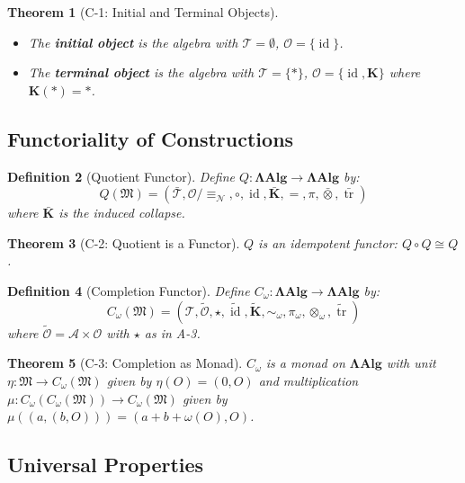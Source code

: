\documentclass[12pt, oneside]{article}
\newtheorem{theorem}{Theorem}[section]
\newtheorem{definition}[theorem]{Definition}
\DeclareMathOperator{\id}{id}
\DeclareMathOperator{\tr}{tr}
\newcommand{\K}{\mathbf{K}}
\newcommand{\N}{\mathcal{N}}
\newcommand{\A}{\mathcal{A}}
\newcommand{\T}{\mathcal{T}}
\newcommand{\Opr}{\mathcal{O}}
\newcommand{\wtilde}{\widetilde}
\newcommand{\mf}[1]{\mathfrak{#1}}
\begin{document}
\begin{theorem}[C-1: Initial and Terminal Objects]
\begin{itemize}
    \item The \textbf{initial object} is the algebra with $\T = \emptyset$, $\Opr = \{\id\}$.
    \item The \textbf{terminal object} is the algebra with $\T = \{*\}$, $\Opr = \{\id, \K\}$ where $\K(*) = *$.
\end{itemize}
\end{theorem}

\subsection{Functoriality of Constructions}

\begin{definition}[Quotient Functor]
Define $Q: \mathbf{ΛAlg} \rightarrow \mathbf{ΛAlg}$ by:
\begin{equation}
Q(\mf{M}) = (\bar{\T}, \Opr/\!\equiv_\N, \circ, \id, \bar{\K}, =, \pi, \bar{\otimes}, \bar{\tr})
\end{equation}
where $\bar{\K}$ is the induced collapse.
\end{definition}

\begin{theorem}[C-2: Quotient is a Functor]
$Q$ is an idempotent functor: $Q \circ Q \cong Q$.
\end{theorem}

\begin{definition}[Completion Functor]
Define $C_\omega: \mathbf{ΛAlg} \rightarrow \mathbf{ΛAlg}$ by:
\begin{equation}
C_\omega(\mf{M}) = (\T, \wtilde{\Opr}, \star, \wtilde{\id}, \wtilde{\K}, \sim_\omega, \pi_\omega, \otimes_\omega, \wtilde{\tr})
\end{equation}
where $\wtilde{\Opr} = \A \times \Opr$ with $\star$ as in A-3.
\end{definition}

\begin{theorem}[C-3: Completion as Monad]
$C_\omega$ is a monad on $\mathbf{ΛAlg}$ with unit $\eta: \mf{M} \rightarrow C_\omega(\mf{M})$ given by $\eta(O) = (0, O)$ and multiplication $\mu: C_\omega(C_\omega(\mf{M})) \rightarrow C_\omega(\mf{M})$ given by $\mu((a, (b, O))) = (a + b + \omega(O), O)$.
\end{theorem}

\subsection{Universal Properties}
\end{document}
